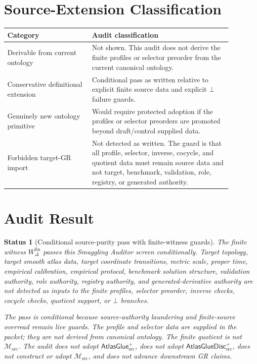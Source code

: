 \documentclass[11pt]{article}
\newcommand{\Msrc}{\mathcal{M}_{\mathrm{src}}}
\newcommand{\AtlasGlue}{\mathsf{AtlasGlue}_{\mathrm{src}}^{+}}
\newcommand{\AtlasGlueDisc}{\mathsf{AtlasGlueDisc}_{\mathrm{src}}^{+}}
\newcommand{\Bot}{\bot}
\newcommand{\Wfin}{W_{\Delta}^{\mathrm{fin}}}
\newtheorem{status}{Status}
\begin{document}
\section{Source-Extension Classification}

\begin{center}
\begin{tabular}{p{0.34\linewidth}p{0.56\linewidth}}
\hline
Category & Audit classification \\
\hline
Derivable from current ontology & Not shown. This audit does not derive the
finite profiles or selector preorder from the current canonical ontology. \\
Conservative definitional extension & Conditional pass as written relative to
explicit finite source data and explicit \(\Bot\) failure guards. \\
Genuinely new ontology primitive & Would require protected adoption if the
profiles or selector preorders are promoted beyond draft/control supplied
data. \\
Forbidden target-GR import & Not detected as written. The guard is that all
profile, selector, inverse, cocycle, and quotient data must remain source data
and not target, benchmark, validation, role, registry, or generated authority. \\
\hline
\end{tabular}
\end{center}

\section{Audit Result}

\begin{status}[Conditional source-purity pass with finite-witness guards]
The finite witness \(\Wfin\) passes this Smuggling Auditor screen
conditionally. Target topology, target smooth atlas data, target coordinate
transitions, metric scale, proper time, empirical calibration, empirical
protocol, benchmark solution structure, validation authority, role authority,
registry authority, and generated-derivative authority are not detected as
inputs to the finite profiles, selector preorder, inverse checks, cocycle
checks, quotient support, or \(\Bot\) branches.

The pass is conditional because source-authority laundering and finite-source
overread remain live guards. The profile and selector data are supplied in the
packet; they are not derived from canonical ontology. The finite quotient is
not \(\Msrc\). The audit does not adopt \(\AtlasGlue\), does not adopt
\(\AtlasGlueDisc\), does not construct or adopt \(\Msrc\), and does not
advance downstream GR claims.
\end{status}
\end{document}
